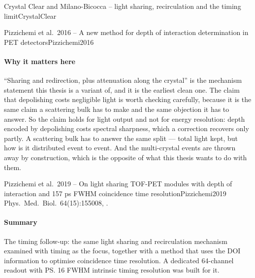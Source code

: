 \begin{programnote}{Crystal Clear and Milano-Bicocca -- light sharing, recirculation and the timing limit}{CrystalClear}
\begin{papernote}{Pizzichemi et al.\ 2016 -- A new method for depth of interaction determination in PET detectors}{Pizzichemi2016}
\paragraph{Why it matters here}
``Sharing and redirection, plus attenuation along the crystal'' is the
mechanism statement this thesis is a variant of, and it is the earliest clean
one. The claim that depolishing costs negligible light is worth checking
carefully, because it is the same claim a scattering bulk has to make and the
same objection it has to answer.
So the claim holds for light output and not for energy resolution: depth
encoded by depolishing costs spectral sharpness, which a correction recovers
only partly. A scattering bulk has to answer the same split --- total light
kept, but how is it distributed event to event. And the multi-crystal events
are thrown away by construction, which is the opposite of what this thesis
wants to do with them.

\end{papernote}

\begin{papernote}{Pizzichemi et al.\ 2019 -- On light sharing TOF-PET modules with depth of interaction and 157 ps FWHM coincidence time resolution}{Pizzichemi2019}
Phys.\ Med.\ Biol.\ 64(15):155008, .

\paragraph{Summary}
The timing follow-up: the same light sharing and recirculation mechanism
examined with timing as the focus, together with a method that uses the DOI
information to optimise coincidence time resolution. A dedicated 64-channel
readout with \ps{16} FWHM intrinsic timing resolution was built for it.


\end{papernote}
\end{programnote}
